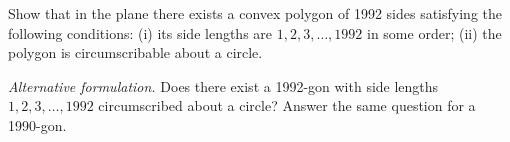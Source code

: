 Show that in the plane there exists a convex polygon of 1992 sides satisfying the following conditions:
(i) its side lengths are $1, 2, 3, \ldots, 1992$ in some order;
(ii) the polygon is circumscribable about a circle.

\textit{Alternative formulation.} Does there exist a 1992-gon with side lengths $1, 2, 3, \ldots, 1992$ circumscribed about a circle? Answer the same question for a 1990-gon.
